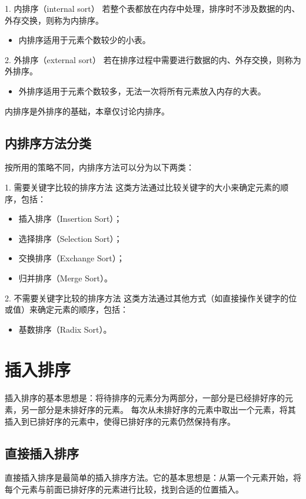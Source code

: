 \documentclass[lang=cn,newtx,10pt,scheme=chinese]{elegantbook}
\begin{document}
1. 内排序（internal sort）  
   若整个表都放在内存中处理，排序时不涉及数据的内、外存交换，则称为内排序。  
   \begin{itemize}
     \item 内排序适用于元素个数较少的小表。
   \end{itemize}

2. 外排序（external sort）  
   若在排序过程中需要进行数据的内、外存交换，则称为外排序。  
   \begin{itemize}
     \item 外排序适用于元素个数较多，无法一次将所有元素放入内存的大表。
   \end{itemize}

内排序是外排序的基础，本章仅讨论内排序。


\subsection{内排序方法分类}

按所用的策略不同，内排序方法可以分为以下两类：

1. 需要关键字比较的排序方法  
   这类方法通过比较关键字的大小来确定元素的顺序，包括：
   \begin{itemize}
     \item 插入排序（Insertion Sort）；
     \item 选择排序（Selection Sort）；
     \item 交换排序（Exchange Sort）；
     \item 归并排序（Merge Sort）。
   \end{itemize}

2. 不需要关键字比较的排序方法  
   这类方法通过其他方式（如直接操作关键字的位或值）来确定元素的顺序，包括：
   \begin{itemize}
     \item 基数排序（Radix Sort）。
   \end{itemize}
\section{插入排序}
插入排序的基本思想是：将待排序的元素分为两部分，一部分是已经排好序的元素，另一部分是未排好序的元素。
每次从未排好序的元素中取出一个元素，将其插入到已排好序的元素中，使得已排好序的元素仍然保持有序。
\subsection{直接插入排序}

直接插入排序是最简单的插入排序方法。它的基本思想是：从第一个元素开始，将每个元素与前面已排好序的元素进行比较，找到合适的位置插入。
\end{document}
